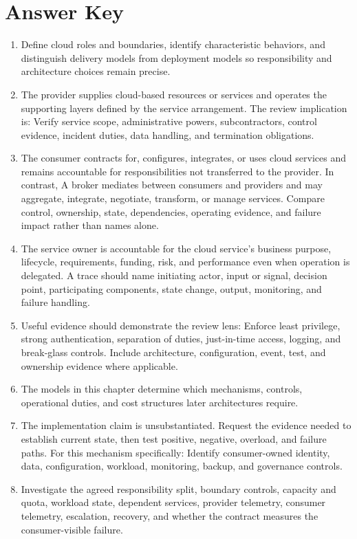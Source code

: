 \documentclass[11pt]{article}
\begin{document}
\section{Answer Key}
\begin{enumerate}
\item Define cloud roles and boundaries, identify characteristic behaviors, and distinguish delivery models from deployment models so responsibility and architecture choices remain precise.
\item The provider supplies cloud-based resources or services and operates the supporting layers defined by the service arrangement. The review implication is: Verify service scope, administrative powers, subcontractors, control evidence, incident duties, data handling, and termination obligations.
\item The consumer contracts for, configures, integrates, or uses cloud services and remains accountable for responsibilities not transferred to the provider. In contrast, A broker mediates between consumers and providers and may aggregate, integrate, negotiate, transform, or manage services. Compare control, ownership, state, dependencies, operating evidence, and failure impact rather than names alone.
\item The service owner is accountable for the cloud service's business purpose, lifecycle, requirements, funding, risk, and performance even when operation is delegated. A trace should name initiating actor, input or signal, decision point, participating components, state change, output, monitoring, and failure handling.
\item Useful evidence should demonstrate the review lens: Enforce least privilege, strong authentication, separation of duties, just-in-time access, logging, and break-glass controls. Include architecture, configuration, event, test, and ownership evidence where applicable.
\item The models in this chapter determine which mechanisms, controls, operational duties, and cost structures later architectures require.
\item The implementation claim is unsubstantiated. Request the evidence needed to establish current state, then test positive, negative, overload, and failure paths. For this mechanism specifically: Identify consumer-owned identity, data, configuration, workload, monitoring, backup, and governance controls.
\item Investigate the agreed responsibility split, boundary controls, capacity and quota, workload state, dependent services, provider telemetry, consumer telemetry, escalation, recovery, and whether the contract measures the consumer-visible failure.

\end{enumerate}
\end{document}
